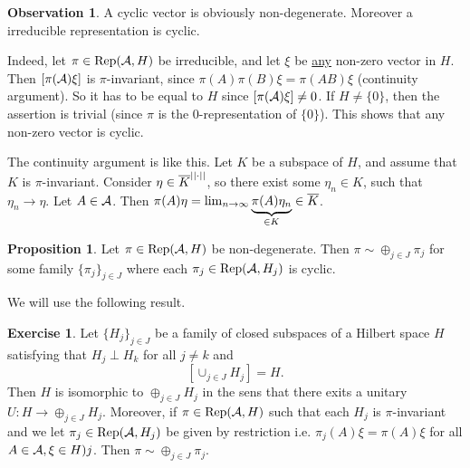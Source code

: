 \documentclass[10pt,english,a4paper]{article}
\theoremstyle{definition}
\newtheorem*{proposition}{Proposition}
\newtheorem*{observation}{Observation}
\newtheorem*{exercise}{Exercise}
\DeclareMathOperator{\Rep}{Rep}
\begin{document}
\begin{observation}
    A cyclic vector is obviously non-degenerate. Moreover a irreducible
representation is cyclic. 

Indeed, let $\pi \in \Rep(\As, H)$ be irreducible,
and let $\xi$ be \ul{any} non-zero vector in $H$.  Then $[\pi(\mathcal{A})\xi]$ is
$\pi$-invariant, since $\pi(A)\pi(B) \xi = \pi(AB)\xi$ (continuity argument).  So
it has to be equal to $H$ since $[\pi(\mathcal{A})\xi]\neq 0$. If $H\neq \{0\}$, then
the assertion is trivial (since $\pi$ is the $0$-representation of $\{0\}$).
This shows that any non-zero vector is cyclic. 

The continuity argument is like this. Let $K$ be a subspace of $H$, and 
assume that $K$ is $\pi$-invariant. Consider $\eta \in \overline{K}^{||\cdot||}$,
so there exist some $\eta_n \in K$, such that $\eta_n\to \eta$. 
Let $A \in \mathcal{A}$. Then $\pi(A)\eta = \lim_{n\to\infty} \underbrace{\pi(A)\eta_n}_{\in K} \in \overline{K}$.
\end{observation}

\begin{proposition}
Let $\pi \in \Rep(\As,H)$ be non-degenerate. Then $\pi \sim \oplus_{j\in J}\pi_j$
for some family $\{\pi_j\}_{j\in J}$ where each $\pi_j \in \Rep(\As,H_j)$ is cyclic.
\end{proposition}
We will use the following result.
\begin{exercise}
Let $\{H_j\}_{j\in J}$ be a family of closed subspaces of a Hilbert space $H$
satisfying that $H_j \perp H_k$ for all $j\neq k$ and 
\[ \left[ \cup_{j\in J}H_j \right] = H. \]
Then $H$ is isomorphic to $\oplus_{j\in J} H_j$ in the sens that there exits a
unitary $U \colon H \to \oplus_{j\in J} H_j$. Moreover, if 
$\pi \in \Rep(\As,H)$ such that each $H_j$ is $\pi$-invariant and we let
$\pi_j\in \Rep(\As,H_j)$ be given by restriction i.e.
$\pi_j(A)\xi = \pi(A)\xi$ for all $A\in \mathcal{A}, \xi\in H)j$.
Then $\pi \sim \oplus_{j\in J}\pi_j$.
\end{exercise}
\end{document}
